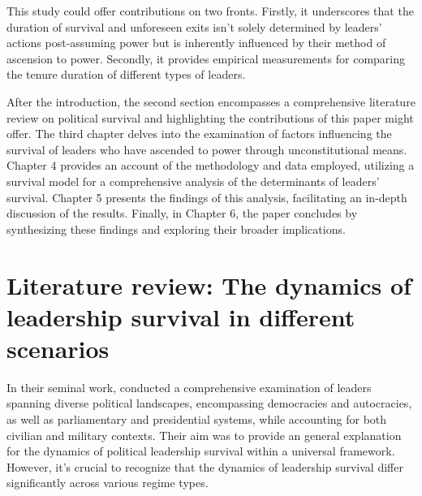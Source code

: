 \documentclass[
  12pt,
  a4paper,
  12pt]{article}
\begin{document}
This study could offer contributions on two fronts. Firstly, it
underscores that the duration of survival and unforeseen exits isn't
solely determined by leaders' actions post-assuming power but is
inherently influenced by their method of ascension to power. Secondly,
it provides empirical measurements for comparing the tenure duration of
different types of leaders.

After the introduction, the second section encompasses a comprehensive
literature review on political survival and highlighting the
contributions of this paper might offer. The third chapter delves into
the examination of factors influencing the survival of leaders who have
ascended to power through unconstitutional means. Chapter 4 provides an
account of the methodology and data employed, utilizing a survival model
for a comprehensive analysis of the determinants of leaders' survival.
Chapter 5 presents the findings of this analysis, facilitating an
in-depth discussion of the results. Finally, in Chapter 6, the paper
concludes by synthesizing these findings and exploring their broader
implications.

\hypertarget{literature-review-the-dynamics-of-leadership-survival-in-different-scenarios}{%
\section{Literature review: The dynamics of leadership survival in
different
scenarios}\label{literature-review-the-dynamics-of-leadership-survival-in-different-scenarios}}

In their seminal work, \citet{buenodemesquita2003} conducted a
comprehensive examination of leaders spanning diverse political
landscapes, encompassing democracies and autocracies, as well as
parliamentary and presidential systems, while accounting for both
civilian and military contexts. Their aim was to provide an general
explanation for the dynamics of political leadership survival within a
universal framework. However, it's crucial to recognize that the
dynamics of leadership survival differ significantly across various
regime types.
\end{document}
